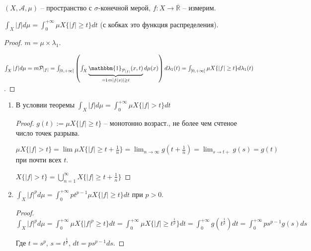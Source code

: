 \begin{theorem}
    $(X, \mathcal{A}, \mu)$ -- пространство с $\sigma$-конечной мерой, $f: X \rightarrow \overline{\mathbb{R}}$ -- измерим.

    $\int_X{|f| d \mu} = \int_{0}^{+\infty} {\mu X \{ |f| \geq t \}}dt$ (с кобках это функция распределения).
\end{theorem}
\begin{proof}
    $m = \mu \times \lambda_{1}$.

    $\int_X{|f| d \mu} = m \mathcal{P}_{|f|} = \int_{[0, +\infty]} {\left(\int_{X} {\underbrace{\mathbbm{1}_{\mathcal{P}_{|f|}}(x, t)}_{=1 \Leftrightarrow |f(x)| \geq t} d \mu(x)}\right) d \lambda_1(t)} = \int_{[0, +\infty]}{\mu X \{ |f| \geq t \} d \lambda_1(t)}$.

\end{proof}

\begin{consequence}
    \begin{enumerate}
        \item {
            В условии теоремы $\int_X {|f| d \mu} = \int_{0}^{+\infty} {\mu X\{ |f| > t \}dt}$

            \begin{proof}
                $g(t) := \mu X \{ |f| \geq t \}$ -- монотонно возраст., не более чем счтеное число точек разрыва.

                $\mu X\{ |f| > t \} = \lim{\mu X \{ |f| \geq t+\frac{1}{n} \}} = \lim_{n \rightarrow \infty}{g(t + \frac{1}{n})} = \lim_{s \rightarrow t+}{g(s)} = g(t)$ при почти всех $t$.

                $X \{ |f| > t \} = \bigcup_{n=1}^{\infty} X \{ |f| \geq t + \frac{1}{n} \}$
            \end{proof}
        }
        \item {
            $\int_X {|f|^p d \mu} = \int_{0}^{+\infty} {p t^{p-1} \mu X\{ |f| \geq t \} dt}$ при $p > 0$.

            \begin{proof}
                $\int_X {|f|^p d \mu} = \int_{0}^{+\infty} {\mu X \{ |f|^p \geq t \}dt} = \int_0^{+\infty}{\mu X \{ |f| \geq t^{\frac{1}{p}} \} dt} = \int_{0}^{+\infty}{g (t^{\frac{1}{p}}) dt} = \int_{0}^{+\infty}{p s^{p-1} g(s) ds}$
                
                Где $t = s^p$, $s = t^{\frac{1}{p}}$, $dt = ps^{p-1}ds$.
            \end{proof}
        }
    \end{enumerate}
\end{consequence}